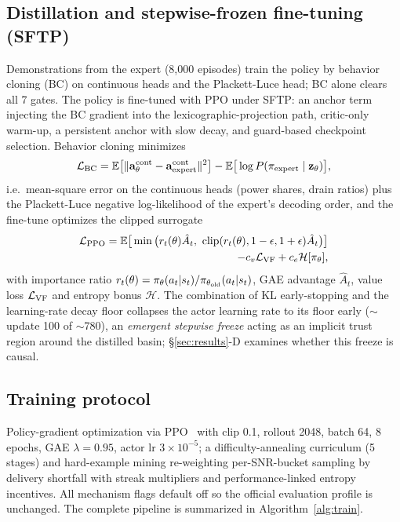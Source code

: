 \documentclass[journal]{IEEEtran}
\newcommand{\vect}[1]{\mathbf{#1}}
\begin{document}
\subsection{Distillation and stepwise-frozen fine-tuning (SFTP)}
Demonstrations from the expert (8{,}000 episodes) train the policy by behavior
cloning (BC) on continuous heads and the Plackett-Luce head; BC alone clears all 7
gates. The policy is fine-tuned with PPO under SFTP: an anchor term injecting the
BC gradient into the lexicographic-projection path, critic-only warm-up, a
persistent anchor with slow decay, and guard-based checkpoint selection.
Behavior cloning minimizes
\begin{equation}
\mathcal{L}_{\rm BC} = \mathbb{E}\big[\|\vect{a}^{\rm cont}_\theta -
\vect{a}^{\rm cont}_{\rm expert}\|^2\big]
- \mathbb{E}\big[\log P(\pi_{\rm expert}\mid\vect{z}_\theta)\big],
\label{eq:bc}
\end{equation}
i.e.\ mean-square error on the continuous heads (power shares, drain ratios)
plus the Plackett-Luce negative log-likelihood of the expert's decoding order,
and the fine-tune optimizes the clipped surrogate
\begin{equation}
\begin{split}
\mathcal{L}_{\rm PPO} = \mathbb{E}\big[\min\big(r_t(\theta)\hat{A}_t,\
\mathrm{clip}(r_t(\theta),1-\epsilon,1+\epsilon)\hat{A}_t\big)\big]\\
- c_v \mathcal{L}_{\rm VF} + c_e \mathcal{H}[\pi_\theta],
\end{split}
\label{eq:ppo}
\end{equation}
with importance ratio $r_t(\theta)=\pi_\theta(a_t|s_t)/
\pi_{\theta_{\rm old}}(a_t|s_t)$, GAE advantage $\hat{A}_t$, value loss
$\mathcal{L}_{\rm VF}$ and entropy bonus $\mathcal{H}$.
The combination of KL early-stopping and the learning-rate decay floor collapses the
actor learning rate to its floor early ($\sim$update 100 of $\sim$780), an
\emph{emergent stepwise freeze} acting as an implicit trust region around the
distilled basin; \S\ref{sec:results}-D examines whether this freeze is causal.

\subsection{Training protocol}
Policy-gradient optimization via PPO~\cite{zhang2023pporsma,sutton1999policy} with
clip 0.1, rollout 2048, batch 64, 8 epochs, GAE $\lambda=0.95$, actor lr
$3\times10^{-5}$; a difficulty-annealing curriculum (5 stages) and hard-example
mining re-weighting per-SNR-bucket sampling by delivery shortfall with streak
multipliers and performance-linked entropy incentives. All mechanism flags
default off so the official evaluation profile is unchanged. The complete
pipeline is summarized in Algorithm~\ref{alg:train}.
\end{document}
